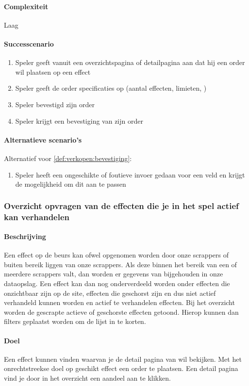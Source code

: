 \paragraph{Complexiteit}Laag
\paragraph{Successcenario}
\begin{enumerate}
 \item Speler geeft vanuit een overzichtspagina of detailpagina aan dat hij een order wil plaatsen op een effect
 \item Speler geeft de order specificaties op (aantal effecten, limieten, )
 \item Speler bevestigd zijn order
 \item \label{def:verkopen:bevestiging} Speler krijgt een bevestiging van zijn order
\end{enumerate}
\paragraph{Alternatieve scenario’s}
Alternatief voor \ref{def:verkopen:bevestiging}:
\begin{enumerate}
 \item Speler heeft een ongeschikte of foutieve invoer gedaan voor een veld en krijgt de mogelijkheid om dit aan te passen
\end{enumerate}

\subsubsection{Overzicht opvragen van de effecten die je in het spel actief kan verhandelen}
\paragraph{Beschrijving} Een effect op de beurs kan ofwel opgenomen worden door onze scrappers of buiten bereik liggen van onze scrappers.
Als deze binnen het bereik van een of meerdere scrappers valt, dan worden er gegevens van bijgehouden in onze dataopslag. Een effect kan dan nog onderverdeeld worden onder effecten die onzichtbaar zijn op de site, effecten die geschorst zijn en dus niet actief verhandeld kunnen worden en actief te verhandelen effecten. Bij het overzicht worden de gescrapte actieve of geschorste effecten getoond. Hierop kunnen dan filters geplaatst worden om de lijst in te korten.
\paragraph{Doel} Een effect kunnen vinden waarvan je de detail pagina van wil bekijken. Met het onrechtstreekse doel op geschikt effect een order te plaatsen. Een detail pagina vind je door in het overzicht een aandeel aan te klikken.
